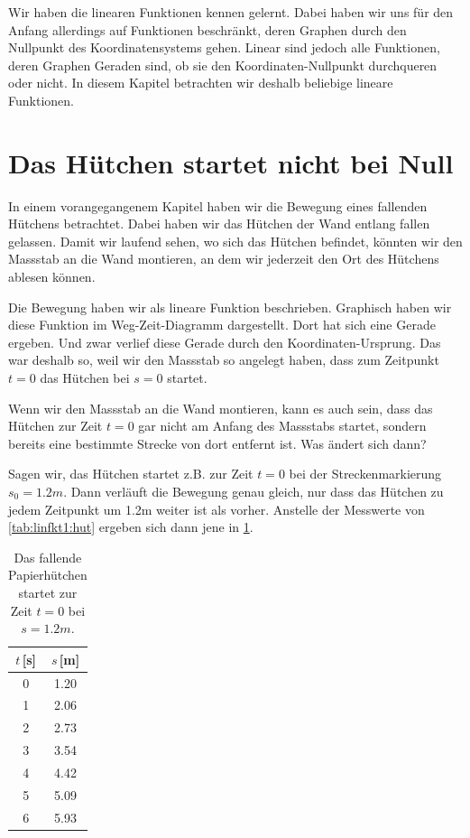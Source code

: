 \documentclass[%
11pt,%
twoside,%
titlepage,%
german,%
headsepline%
]{scrartcl}
\begin{document}
{{\begin{enumerate}
\end{enumerate}}

\clearpage

Wir haben die linearen Funktionen kennen gelernt. Dabei haben wir uns f\"ur den Anfang allerdings auf Funktionen beschr\"ankt, deren Graphen durch den Nullpunkt des Koordinatensystems gehen. Linear sind jedoch alle Funktionen, deren Graphen Geraden sind, ob sie den Koordinaten-Nullpunkt durchqueren oder nicht. In diesem Kapitel betrachten wir deshalb beliebige lineare Funktionen.

\section{Das H\"utchen startet nicht bei Null}
\label{linfkt2:was}

In einem vorangegangenem Kapitel haben wir die Bewegung eines fallenden H\"utchens betrachtet. Dabei haben wir das H\"utchen der Wand entlang fallen gelassen. Damit wir laufend sehen, wo sich das H\"utchen befindet, k\"onnten wir den Massstab an die Wand montieren, an dem wir jederzeit den Ort des H\"utchens ablesen k\"onnen.

Die Bewegung haben wir als lineare Funktion beschrieben. Graphisch haben wir diese Funktion im Weg-Zeit-Diagramm dargestellt. Dort hat sich eine Gerade ergeben. Und zwar verlief diese Gerade durch den Koordinaten-Ursprung. Das war deshalb so, weil wir den Massstab so angelegt haben, dass zum Zeitpunkt $t=0$ das H\"utchen bei $s=0$ startet. 

Wenn wir den Massstab an die Wand montieren, kann es auch sein, dass das H\"utchen zur Zeit $t=0$ gar nicht am Anfang des Massstabs startet, sondern bereits eine bestimmte Strecke von dort entfernt ist. Was \"andert sich dann?

Sagen wir, das H\"utchen startet z.B. zur Zeit $t=0$ bei der Streckenmarkierung $s_0=1.2\unit{m}$. Dann verl\"auft die Bewegung genau gleich, nur dass das H\"utchen zu jedem Zeitpunkt um 1.2\unit{m} weiter ist als vorher. Anstelle der Messwerte von \ref{tab:linfkt1:hut} ergeben sich dann jene in \ref{tab:linfkt2:huts0}.

\begin{table}[b!]
\centering
\begin{tabular}{|c|c|}
\hline
$t$\,[s] & $s$\,[m] \\ \hline\hline
0 & 1.20 \\ \hline
1 & 2.06 \\ \hline
2 & 2.73 \\ \hline
3 & 3.54 \\ \hline
4 & 4.42 \\ \hline
5 & 5.09 \\ \hline
6 & 5.93 \\ \hline
\end{tabular}
\caption{Das fallende Papierh\"utchen startet zur Zeit $t=0$ bei $s=1.2\unit{m}$.}
\label{tab:linfkt2:huts0}
\end{table}  

}
\end{document}
